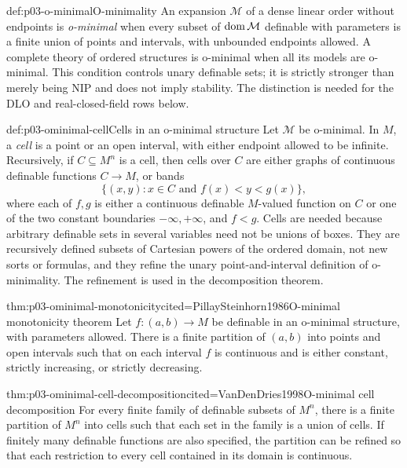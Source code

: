 \begin{hbdefinition}{def:p03-o-minimal}{O-minimality}
An expansion \(\mathcal M\) of a dense linear order without endpoints is
\emph{o-minimal} when every subset of \(\operatorname{dom}\mathcal M\) definable with
parameters is a finite union of points and intervals, with unbounded endpoints
allowed.  A complete theory of ordered structures is o-minimal when all its
models are o-minimal.  This condition controls unary definable sets; it is
strictly stronger than merely being NIP and does not imply stability.  The
distinction is needed for the DLO and real-closed-field rows below.
\end{hbdefinition}

\begin{hbdefinition}{def:p03-ominimal-cell}{Cells in an o-minimal structure}
Let \(\mathcal M\) be o-minimal.  In \(M\), a \emph{cell} is a point or an
open interval, with either endpoint allowed to be infinite.  Recursively, if
\(C\subseteq M^n\) is a cell, then cells over \(C\) are either graphs of
continuous definable functions \(C\to M\), or bands
\[
\{(x,y):x\in C\text{ and }f(x)<y<g(x)\},
\]
where each of \(f,g\) is either a continuous definable \(M\)-valued function
on \(C\) or one of the two constant boundaries \(-\infty,+\infty\), and
\(f<g\).  Cells are needed because arbitrary definable sets
in several variables need not be unions of boxes.  They are recursively
defined subsets of Cartesian powers of the ordered domain, not new sorts or
formulas, and they refine the unary point-and-interval definition of
o-minimality.  The refinement is used in the decomposition theorem.
\end{hbdefinition}

\begin{hbtheorem}{thm:p03-ominimal-monotonicity}{cited=PillaySteinhorn1986}{O-minimal monotonicity theorem}
Let \(f:(a,b)\to M\) be definable in an o-minimal structure, with parameters
allowed.  There is a finite partition of \((a,b)\) into points and open
intervals such that on each interval \(f\) is continuous and is either
constant, strictly increasing, or strictly decreasing.
\end{hbtheorem}

\begin{hbtheorem}{thm:p03-ominimal-cell-decomposition}{cited=VanDenDries1998}{O-minimal cell decomposition}
For every finite family of definable subsets of \(M^n\), there is a finite
partition of \(M^n\) into cells such that each set in the family is a union of
cells.  If finitely many definable functions are also specified, the partition
can be refined so that each restriction to every cell contained in its domain
is continuous.
\end{hbtheorem}

